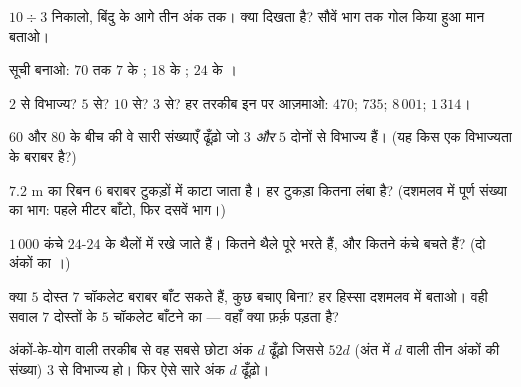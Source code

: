 \begin{exercise}[$\star$]\label{exo:g5:division:4}
$10 \div 3$ निकालो, बिंदु के आगे तीन अंक तक। क्या दिखता है?
सौवें भाग तक गोल किया हुआ मान बताओ।
\end{exercise}

\begin{exercise}[$\star$]\label{exo:g5:division:5}
सूची बनाओ: $70$ तक $7$ के ; $18$ के ;
$24$ के ।
\end{exercise}

\begin{exercise}[$\star$]\label{exo:g5:division:6}
$2$ से विभाज्य? $5$ से? $10$ से? $3$ से? हर तरकीब इन पर आज़माओ:
$470$; \quad $735$; \quad $8\,001$; \quad $1\,314$।
\end{exercise}

\begin{exercise}[$\star$]\label{exo:g5:division:7}
$60$ और $80$ के बीच की वे सारी संख्याएँ ढूँढ़ो जो $3$
\emph{और} $5$ दोनों से विभाज्य हैं। (यह किस एक विभाज्यता के
बराबर है?)
\end{exercise}

\begin{exercise}[$\star$]\label{exo:g5:division:8}
$7.2$ m का रिबन $6$ बराबर टुकड़ों में काटा जाता है। हर टुकड़ा
कितना लंबा है? (दशमलव में पूर्ण संख्या का भाग: पहले मीटर बाँटो,
फिर दसवें भाग।)
\end{exercise}

\begin{exercise}[$\star$]\label{exo:g5:division:9}
$1\,000$ कंचे $24$-$24$ के थैलों में रखे जाते हैं। कितने थैले
पूरे भरते हैं, और कितने कंचे बचते हैं? (दो अंकों का ।)
\end{exercise}

\begin{exercise}[$\star\star$]\label{exo:g5:division:10}
क्या $5$ दोस्त $7$ चॉकलेट बराबर बाँट सकते हैं, कुछ बचाए बिना?
हर हिस्सा दशमलव में बताओ। वही सवाल $7$ दोस्तों के $5$ चॉकलेट
बाँटने का --- वहाँ क्या फ़र्क़ पड़ता है?
\end{exercise}

\begin{exercise}[$\star\star$]\label{exo:g5:division:11}
अंकों-के-योग वाली तरकीब से वह सबसे छोटा अंक $d$ ढूँढ़ो जिससे
$52d$ (अंत में $d$ वाली तीन अंकों की संख्या) $3$ से विभाज्य हो।
फिर ऐसे सारे अंक $d$ ढूँढ़ो।
\end{exercise}
